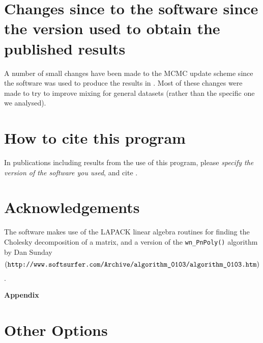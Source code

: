 \documentclass[11pt,titlepage,times,letterpaper]{article}
\begin{document}

\section{Changes since to the software since the version used to 
obtain the published results}

A number of small changes have been made to the MCMC update scheme
since the software was used to produce the results in
\cite{wasser.etal.04}.  Most of these changes were made to try to
improve mixing for general datasets (rather than the specific one we
analysed).

\section{How to cite this program}

In publications including results from the use of this program, please
{\it specify the version of the software you used}, and cite
\cite{wasser.etal.04}.


\section{Acknowledgements}

The software makes use of the LAPACK linear algebra routines for
finding the Cholesky decomposition of a matrix, and a version of the
{\tt wn\_PnPoly()} algorithm by Dan Sunday 
$$(\text{\tt http://www.softsurfer.com/Archive/algorithm\_0103/algorithm\_0103.htm})$$.


\clearpage

\appendix
\begin{centering}
{\bf Appendix}
\end{centering}

\section{Other Options}
\end{document}
